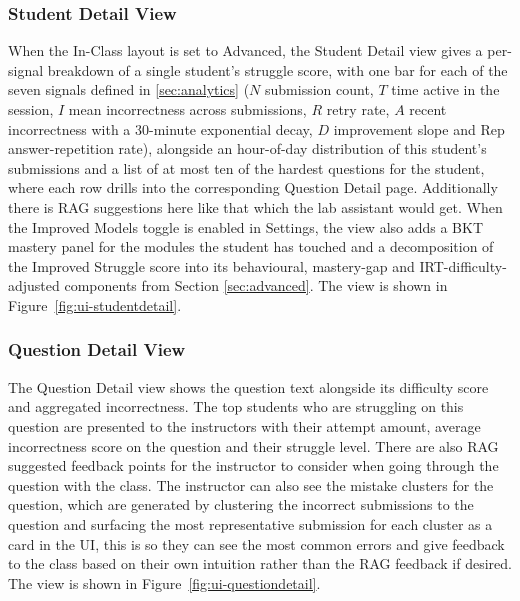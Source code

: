 
\subsubsection{Student Detail View}

When the In-Class layout is set to Advanced, the Student Detail view gives a per-signal breakdown of a single student's struggle score, with one bar for each of the seven signals defined in \ref{sec:analytics} ($N$ submission count, $T$ time active in the session, $I$ mean incorrectness across submissions, $R$ retry rate, $A$ recent incorrectness with a 30-minute exponential decay, $D$ improvement slope and $\mathrm{Rep}$ answer-repetition rate), alongside an hour-of-day distribution of this student's submissions and a list of at most ten of the hardest questions for the student, where each row drills into the corresponding Question Detail page. Additionally there is RAG suggestions here like that which the lab assistant would get. When the Improved Models toggle is enabled in Settings, the view also adds a BKT mastery panel for the modules the student has touched and a decomposition of the Improved Struggle score into its behavioural, mastery-gap and IRT-difficulty-adjusted components from Section \ref{sec:advanced}. The view is shown in Figure~\ref{fig:ui-studentdetail}.



\subsubsection{Question Detail View}

The Question Detail view shows the question text alongside its difficulty score and aggregated incorrectness. 
The top students who are struggling on this question are presented to the instructors with their attempt amount, average incorrectness score on the question and their struggle level. 
There are also RAG suggested feedback points for the instructor to consider when going through the question with the class. 
The instructor can also see the mistake clusters for the question, which are generated by clustering the incorrect submissions to the question and surfacing the most representative submission for each cluster as a card in the UI, this is so they can see the most common errors and give feedback to the class based on their own intuition rather than the RAG feedback if desired. The view is shown in Figure~\ref{fig:ui-questiondetail}.


